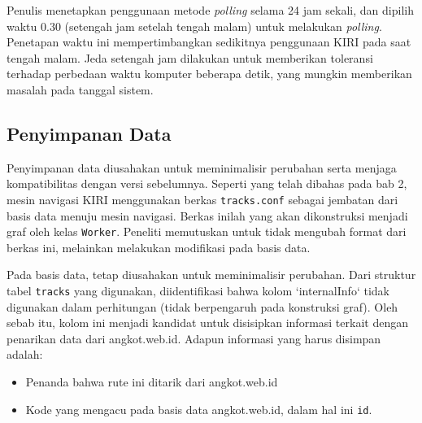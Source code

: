 Penulis menetapkan penggunaan metode \textit{polling} selama 24 jam sekali, dan dipilih waktu 0.30 (setengah jam setelah tengah malam) untuk melakukan \textit{polling}. Penetapan waktu ini mempertimbangkan sedikitnya penggunaan KIRI pada saat tengah malam. Jeda setengah jam dilakukan untuk memberikan toleransi terhadap perbedaan waktu komputer beberapa detik, yang mungkin memberikan masalah pada tanggal sistem. 

\subsection{Penyimpanan Data}

Penyimpanan data diusahakan untuk meminimalisir perubahan serta menjaga kompatibilitas dengan versi sebelumnya. Seperti yang telah dibahas pada bab 2, mesin navigasi KIRI menggunakan berkas \verb/tracks.conf/ sebagai jembatan dari basis data menuju mesin navigasi. Berkas inilah yang akan dikonstruksi menjadi graf oleh kelas \verb/Worker/. Peneliti memutuskan untuk tidak mengubah format dari berkas ini, melainkan melakukan modifikasi pada basis data.

Pada basis data, tetap diusahakan untuk meminimalisir perubahan. Dari struktur tabel \verb/tracks/ yang digunakan, diidentifikasi bahwa kolom `internalInfo` tidak digunakan dalam perhitungan (tidak berpengaruh pada konstruksi graf). Oleh sebab itu, kolom ini menjadi kandidat untuk disisipkan informasi terkait dengan penarikan data dari angkot.web.id. Adapun informasi yang harus disimpan adalah:

\begin{itemize}
	\item Penanda bahwa rute ini ditarik dari angkot.web.id
	\item Kode yang mengacu pada basis data angkot.web.id, dalam hal ini \verb/id/.
\end{itemize}


